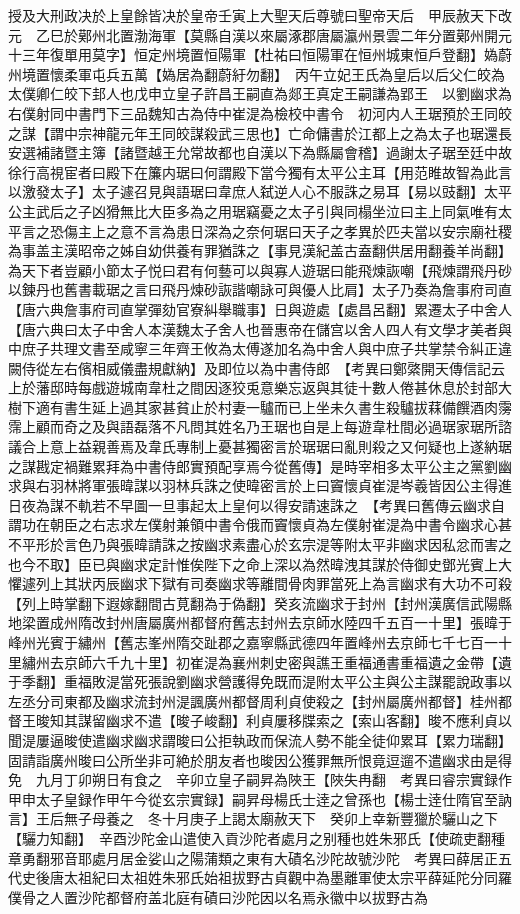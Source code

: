 授及大刑政决於上皇餘皆决於皇帝壬寅上大聖天后尊號曰聖帝天后　甲辰赦天下改元　乙巳於鄚州北置渤海軍【莫縣自漢以來屬涿郡唐屬瀛州景雲二年分置鄚州開元十三年復單用莫字】恒定州境置恒陽軍【杜祐曰恒陽軍在恒州城東恒戶登翻】媯蔚州境置懷柔軍屯兵五萬【媯居為翻蔚紆勿翻】　丙午立妃王氏為皇后以后父仁皎為太僕卿仁皎下邽人也戊申立皇子許昌王嗣直為郯王真定王嗣謙為郢王　以劉幽求為右僕射同中書門下三品魏知古為侍中崔湜為檢校中書令　初河内人王琚預於王同皎之謀【謂中宗神龍元年王同皎謀殺武三思也】亡命傭書於江都上之為太子也琚還長安選補諸暨主簿【諸暨越王允常故都也自漢以下為縣屬會稽】過謝太子琚至廷中故徐行高視宦者曰殿下在簾内琚曰何謂殿下當今獨有太平公主耳【用范睢故智為此言以激發太子】太子遽召見與語琚曰韋庶人弑逆人心不服誅之易耳【易以豉翻】太平公主武后之子凶猾無比大臣多為之用琚竊憂之太子引與同榻坐泣曰主上同氣唯有太平言之恐傷主上之意不言為患日深為之奈何琚曰天子之孝異於匹夫當以安宗廟社稷為事盖主漢昭帝之姊自幼供養有罪猶誅之【事見漢紀盖古盍翻供居用翻養羊尚翻】為天下者豈顧小節太子悦曰君有何藝可以與寡人遊琚曰能飛煉詼嘲【飛煉謂飛丹砂以鍊丹也舊書載琚之言曰飛丹煉砂詼諧嘲詠可與優人比肩】太子乃奏為詹事府司直【唐六典詹事府司直掌彈劾官寮糾舉職事】日與遊處【處昌呂翻】累遷太子中舍人【唐六典曰太子中舍人本漢魏太子舍人也晉惠帝在儲宫以舍人四人有文學才美者與中庶子共理文書至咸寧三年齊王攸為太傅遂加名為中舍人與中庶子共掌禁令糾正違闕侍從左右儐相威儀盡規獻納】及即位以為中書侍郎　【考異曰鄭綮開天傳信記云上於藩邸時每戲遊城南韋杜之間因逐狡兎意樂忘返與其徒十數人倦甚休息於封部大樹下適有書生延上過其家甚貧止於村妻一驢而已上坐未久書生殺驢拔䔉備饌酒肉霶霈上顧而奇之及與語磊落不凡問其姓名乃王琚也自是上每遊韋杜間必過琚家琚所諮議合上意上益親善焉及韋氏專制上憂甚獨密言於琚琚曰亂則殺之又何疑也上遂納琚之謀戡定禍難累拜為中書侍郎實預配享焉今從舊傳】是時宰相多太平公主之黨劉幽求與右羽林將軍張暐謀以羽林兵誅之使暐密言於上曰竇懷貞崔湜岑羲皆因公主得進日夜為謀不軌若不早圖一旦事起太上皇何以得安請速誅之　【考異曰舊傳云幽求自謂功在朝臣之右志求左僕射兼領中書令俄而竇懷貞為左僕射崔湜為中書令幽求心甚不平形於言色乃與張暐請誅之按幽求素盡心於玄宗湜等附太平非幽求因私忿而害之也今不取】臣已與幽求定計惟俟陛下之命上深以為然暐洩其謀於侍御史鄧光賓上大懼遽列上其狀丙辰幽求下獄有司奏幽求等離間骨肉罪當死上為言幽求有大功不可殺【列上時掌翻下遐嫁翻間古莧翻為于偽翻】癸亥流幽求于封州【封州漢廣信武陽縣地梁置成州隋改封州唐屬廣州都督府舊志封州去京師水陸四千五百一十里】張暐于峰州光賓于繡州【舊志峯州隋交趾郡之嘉寧縣武德四年置峰州去京師七千七百一十里繡州去京師六千九十里】初崔湜為襄州刺史密與譙王重福通書重福遺之金帶【遺于季翻】重福敗湜當死張說劉幽求營護得免既而湜附太平公主與公主謀罷說政事以左丞分司東都及幽求流封州湜諷廣州都督周利貞使殺之【封州屬廣州都督】桂州都督王晙知其謀留幽求不遣【晙子峻翻】利貞屢移牒索之【索山客翻】晙不應利貞以聞湜屢逼晙使遣幽求幽求謂晙曰公拒執政而保流人勢不能全徒仰累耳【累力瑞翻】固請詣廣州晙曰公所坐非可絶於朋友者也晙因公獲罪無所恨竟逗遛不遣幽求由是得免　九月丁卯朔日有食之　辛卯立皇子嗣昇為陜王【陜失冉翻　考異曰睿宗實録作甲申太子皇録作甲午今從玄宗實録】嗣昇母楊氏士逹之曾孫也【楊士逹仕隋官至訥言】王后無子母養之　冬十月庚子上謁太廟赦天下　癸卯上幸新豐獵於驪山之下【驪力知翻】　辛酉沙陀金山遣使入貢沙陀者處月之别種也姓朱邪氏【使疏吏翻種章勇翻邪音耶處月居金娑山之陽蒲類之東有大磧名沙陀故號沙陀　考異曰薛居正五代史後唐太祖紀曰太祖姓朱邪氏始祖拔野古貞觀中為墨離軍使太宗平薛延陀分同羅僕骨之人置沙陀都督府盖北庭有磧曰沙陀因以名焉永徽中以拔野古為
